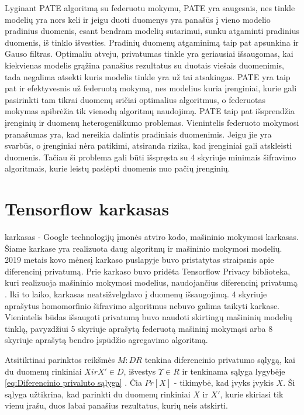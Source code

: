\documentclass{VUMIFInfBakalaurinis}
\begin{document}
\par Lyginant PATE algoritmą su federuotu mokymu, PATE yra saugesnis, nes tinkle modelių yra nors keli ir jeigu duoti duomenys yra panašūs į vieno modelio pradinius duomenis, esant bendram modelių sutarimui, sunku atgaminti pradinius duomenis, iš tinklo išvesties. Pradinių duomenų atgaminimą taip pat apsunkina ir Gauso filtras. Optimaliu atveju, privatumas tinkle yra geriausiai išsaugomas, kai kiekvienas modelis grąžina panašius rezultatus su duotais viešais duomenimis, tada negalima atsekti kuris modelis tinkle yra už tai atsakingas. PATE yra taip pat ir efektyvesnis už federuotą mokymą, nes modelius kuria įrenginiai, kurie gali pasirinkti tam tikrai duomenų sričiai optimalius algoritmus, o federuotas mokymas apibrėžia tik vienodų algoritmų naudojimą. PATE taip pat išsprendžia įrenginių ir duomenų heterogeniškumo problemas. Vienintelis federuoto mokymosi pranašumas yra, kad nereikia dalintis pradiniais duomenimis. Jeigu jie yra svarbūs, o įrenginiai nėra patikimi, atsiranda rizika, kad įrenginiai gali atskleisti duomenis. Tačiau ši problema gali būti išspręsta su 4 skyriuje minimais šifravimo algoritmais, kurie leistų paslėpti duomenis nuo pačių įrenginių.

\section{Tensorflow karkasas}
\par {} karkasas - Google technologijų įmonės atviro kodo, mašininio mokymosi karkasas. Šiame karkase yra realizuota daug algoritmų ir mašininio mokymosi modelių. 2019 metais kovo mėnesį  karkaso puslapyje buvo pristatytas straipsnis apie diferencinį privatumą. Prie  karkaso buvo pridėta Tensorflow Privacy biblioteka, kuri realizuoja mašininio mokymosi modelius, naudojančius diferencinį privatumą \cite{29}. Iki to laiko,  karkasas neatsižvelgdavo į duomenų išsaugojimą. 4 skyriuje aprašytus homomorfinio šifravimo algoritmus nebuvo galima taikyti karkase. Vienintelis būdas išsaugoti privatumą buvo naudoti skirtingų mašininių modelių tinklą, pavyzdžiui 5 skyriuje aprašytą federuotą mašininį mokymąsi arba 8 skyriuje aprašytą bendro įspūdžio agregavimo algoritmą.
\par Atsitiktinai parinktos reikšmės $M : D $\rightarrow$ R$ tenkina diferencinio privatumo sąlygą, kai du duomenų rinkiniai $X ir X' \in D$, išvestys $\Upsilon \in R$ ir tenkinama sąlyga lygybėje \ref{eq:Diferencinio privaluto sąlyga} \cite{30}. Čia $Pr[X]$ - tikimybė, kad įvyks įvykis $X$. Ši sąlyga užtikrina, kad parinkti du duomenų rinkiniai $X$ ir $X'$, kurie skiriasi tik vienu įrašu, duos labai panašius rezultatus, kurių neis atskirti.
\end{document}
